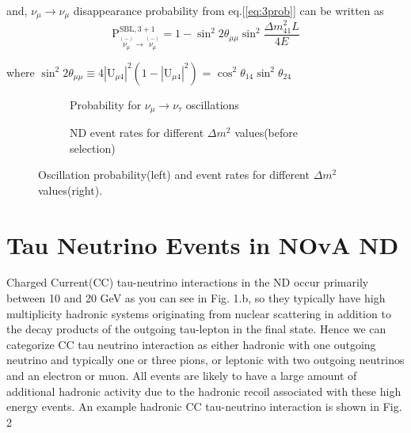 \documentclass[12pt]{article}
\begin{document}
\noindent and, $\nu_{\mu} \rightarrow \nu_{\mu}$ disappearance probability from eq.[\ref{eq:3prob}] can be written as
\begin{equation}\label{eqn:disapp_prob}
\text{P}^{\text{SBL},3+1}_{\overset{(-)}{\nu_{\mu}}\rightarrow \overset{(-)}{\nu_{\mu}}} = 1 - \sin^2{2\theta_{\mu\mu}}\sin^2{\frac{\Delta m^2_{41}L}{4E}}
\end{equation} 

where $\sin^2{2\theta_{\mu\mu}} \equiv 4|\text{U}_{\mu4}|^{2}(1-|\text{U}_{\mu4}|^{2})$  = $\cos^{2}\theta_{14} \sin^{2}\theta_{24}$
\begin{figure}
\centering
\begin{subfigure}{.5\textwidth}
  \centering
{}
   \caption{Probability for $\nu_\mu\rightarrow\nu_\tau$ oscillations}
  \label{fig:sub1}
\end{subfigure}%
\begin{subfigure}{.5\textwidth}
  \centering
{}
  \caption{ND event rates for  different $\Delta m^2$ values(before selection)}
  \label{fig:sub2}
\end{subfigure}
\caption{Oscillation probability(left) and event rates for different  $\Delta m^2$ values(right).}
\label{fig:test}
\end{figure}

\section{Tau Neutrino Events in NOvA ND}
Charged Current(CC) tau-neutrino interactions in the ND occur primarily between 10 and 20 GeV as you can see in Fig. 1.b, so they typically have high multiplicity hadronic systems originating from nuclear scattering in addition to the decay products of the outgoing tau-lepton in the final state. Hence we can categorize CC tau neutrino interaction as either hadronic with one outgoing neutrino and typically one or three pions, or leptonic with two outgoing neutrinos and an electron or muon.  All events are likely to have a large amount of additional hadronic activity due to the hadronic recoil associated with these high energy events. An example hadronic CC tau-neutrino interaction is shown in Fig. 2
 
\end{document}

